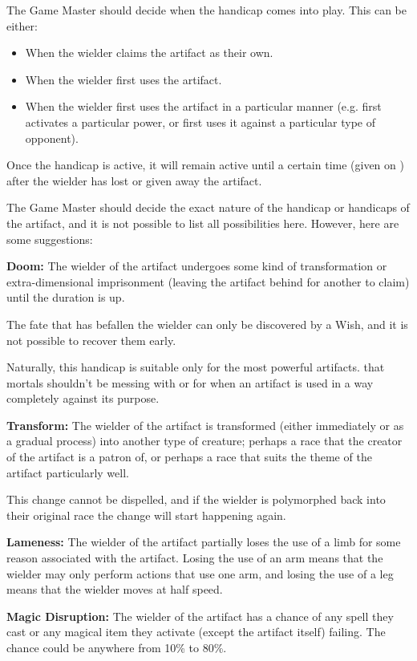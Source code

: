 \begin{multicols*}{2}
The Game Master should decide when the handicap comes into play. This can be either:

\begin{itemize}
	\item{When the wielder claims the artifact as their own.}
	\item{When the wielder first uses the artifact.}
	\item{When the wielder first uses the artifact in a particular manner (e.g. first activates a particular power, or first uses it against a particular type of opponent).}
\end{itemize}

Once the handicap is active, it will remain active until a certain time (given on ) after the wielder has lost or given away the artifact.

The Game Master should decide the exact nature of the handicap or handicaps of the artifact, and it is not possible to list all possibilities here. However, here are some suggestions:

\textbf{Doom:} The wielder of the artifact undergoes some kind of transformation or extra-dimensional imprisonment (leaving the artifact behind for another to claim) until the duration is up.

The fate that has befallen the wielder can only be discovered by a Wish, and it is not possible to recover them early.

Naturally, this handicap is suitable only for the most powerful artifacts. that mortals shouldn’t be messing with or for when an artifact is used in a way completely against its purpose.

\textbf{Transform:} The wielder of the artifact is transformed (either immediately or as a gradual process) into another type of creature; perhaps a race that the creator of the artifact is a patron of, or perhaps a race that suits the theme of the artifact particularly well.

This change cannot be dispelled, and if the wielder is polymorphed back into their original race the change will start happening again.

\textbf{Lameness:} The wielder of the artifact partially loses the use of a limb for some reason associated with the artifact. Losing the use of an arm means that the wielder may only perform actions that use one arm, and losing the use of a leg means that the wielder moves at half speed.

\textbf{Magic Disruption:} The wielder of the artifact has a chance of any spell they cast or any magical item they activate (except the artifact itself) failing. The chance could be anywhere from 10\% to 80\%.


\end{multicols*}
